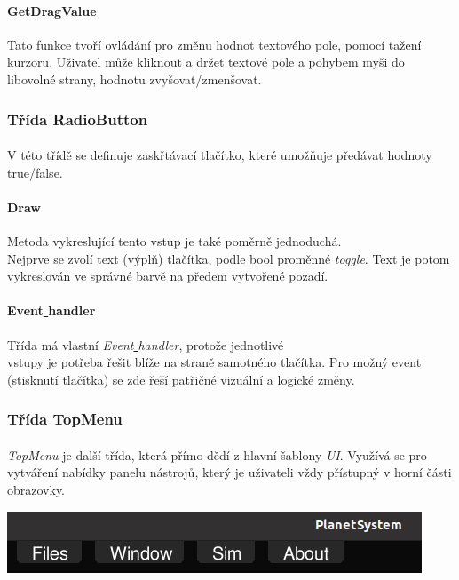 \documentclass[a4paper, 12pt]{article}
\begin{document}
\paragraph{GetDragValue}
Tato funkce tvoří ovládání pro změnu hodnot textového pole, pomocí tažení
kurzoru. Uživatel může kliknout a držet textové pole a pohybem myši do
libovolné strany, hodnotu zvyšovat/zmenšovat.

\newpage
\subsubsection{Třída RadioButton}
\paragraph{}
V této třídě se definuje zaskřtávací tlačítko, které umožňuje předávat hodnoty
true/false.

\paragraph{Draw}
Metoda vykreslující tento vstup je také poměrně jednoduchá. \\Nejprve se zvolí
text (výplň) tlačítka, podle bool proměnné \emph{toggle}. Text je potom
vykreslován ve správné barvě na předem vytvořené pozadí.

\paragraph{Event\underline{ }handler}
Třída má vlastní \emph{Event\underline{ }handler}, protože jednotlivé \\vstupy je
potřeba řešit blíže na straně samotného tlačítka. Pro možný event (stisknutí
tlačítka) se zde řeší patřičné vizuální a logické změny.
\\
\subsubsection{Třída TopMenu}
\paragraph{}
\emph{TopMenu} je další třída, která přímo dědí z hlavní šablony \emph{UI}.
Využívá se pro vytváření nabídky panelu nástrojů, který je uživateli vždy
přístupný v horní části obrazovky.

\begin{center}
    \includegraphics[width=0.9\linewidth]{p3_crop.png}
\end{center}
\end{document}
